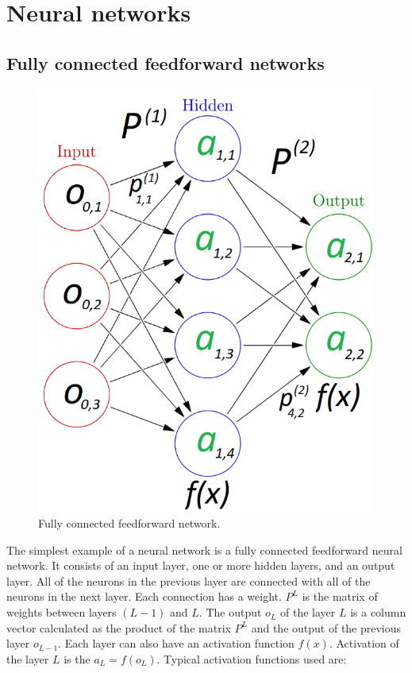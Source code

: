 \section{Neural networks} \label{neural_network}

\subsection{Fully connected feedforward networks} \label{feedforward_nn}

\begin{figure}[b!]
	\centering
	\includegraphics[totalheight=7cm]{pics/nn_1.png}
	\caption{Fully connected feedforward network.}
	\label{fig:nn1}
\end{figure}

The simplest example of a neural network is a fully connected feedforward neural network. It consists of an input layer, one or more hidden layers, and an output layer. All of the neurons in the previous layer are connected with all of the neurons in the next layer. Each connection has a weight. $ P^L $ is the matrix of weights between layers $ (L - 1) $ and $ L $. The output $ o_L $ of the layer $ L $ is a column vector calculated as the product of the matrix $ P^L $ and the output of the previous layer $ o_{L-1} $. Each layer can also have an activation function $ f(x) $. Activation of the layer $ L $ is the $ a_L = f(o_L) $. Typical activation functions used are:

